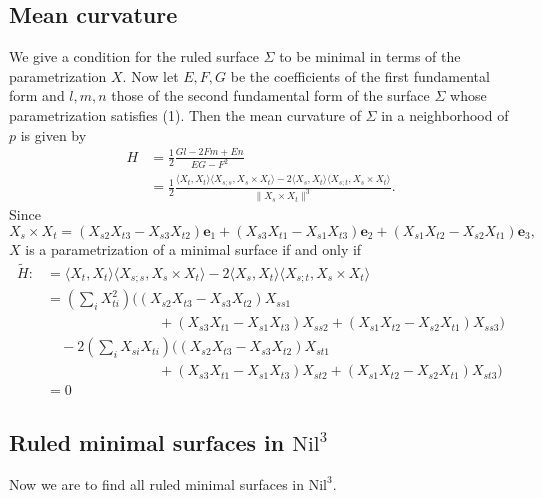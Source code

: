 \documentclass[11pt]{amsart}
\begin{document}
\subsection{Mean curvature} We give a condition for the
ruled surface $\Sigma$ to be minimal in terms of the
parametrization $X.$ Now let $E, F, G$ be the coefficients of the
first fundamental form and $l, m, n$ those of the second
fundamental form of the surface $\Sigma$ whose parametrization
satisfies (1). Then the mean curvature of $\Sigma$ in a
neighborhood of $p$ is given by
\[
\begin{split}
   H &=\frac12 \frac {Gl-2Fm+En}{EG-F^2}\\
     &=\frac12 \frac{ \langle X_t , X_t \rangle \langle X_{s;s}, X_s \times X_t
     \rangle
           -2\langle X_s , X_t \rangle\langle X_{s;t}, X_s \times X_t \rangle} {\| X_s \times
           X_t\|^3}.
\end{split}
\]
Since $$X_s \times X_t = (X_{s2}X_{t3}-X_{s3}X_{t2}) {\mathbf{e}}_1
                   + (X_{s3}X_{t1}-X_{s1}X_{t3}){\mathbf{e}}_2
                   + (X_{s1}X_{t2}-X_{s2}X_{t1}){\mathbf{e}}_3 ,$$
$X$ is a parametrization of a minimal surface if and only if
\begin{equation}\label{mineq}
\begin{split}
    \tilde H :
     &= \langle X_t , X_t\rangle\langle X_{s;s}, X_s \times X_t\rangle - 2\langle X_s , X_t\rangle\langle X_{s;t}, X_s \times X_t\rangle \\
     &= \left( \sum_i X_{ti}^2 \right) \bigg( (X_{s2}X_{t3}-X_{s3}X_{t2})X_{ss1} \\
     &\qquad\qquad \qquad\qquad
       +(X_{s3}X_{t1}-X_{s1}X_{t3})X_{ss2}+(X_{s1}X_{t2}-X_{s2}X_{t1})X_{ss3}\bigg) \\
     &\quad -2 \left(\sum_i X_{si}X_{ti}\right) \bigg( (X_{s2}X_{t3}-X_{s3}X_{t2})X_{st1} \\
     &\qquad\qquad \qquad\qquad
       +(X_{s3}X_{t1}-X_{s1}X_{t3})X_{st2} +(X_{s1}X_{t2}-X_{s2}X_{t1})X_{st3}\bigg) \\
     &=0
\end{split}
\end{equation}

\subsection{Ruled minimal surfaces in $\text{Nil}^3$}

Now we are to find all ruled minimal surfaces in $\text{Nil}^3$.
\end{document}
